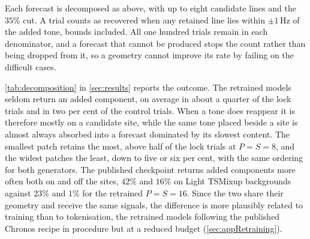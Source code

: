 Each forecast is decomposed as above, with up to eight candidate lines and the $35\%$ cut. A trial counts as recovered when any retained line lies within $\pm1$\,Hz of the added tone, bounds included. All one hundred trials remain in each denominator, and a forecast that cannot be produced stops the count rather than being dropped from it, so a geometry cannot improve its rate by failing on the difficult cases.

\autoref{tab:decomposition} in \autoref{sec:results} reports the outcome. The retrained models seldom return an added component, on average in about a quarter of the lock trials and in two per cent of the control trials. When a tone does reappear it is therefore mostly on a candidate site, while the same tone placed beside a site is almost always absorbed into a forecast dominated by its slowest content. The smallest patch retains the most, above half of the lock trials at $P=S=8$, and the widest patches the least, down to five or six per cent, with the same ordering for both generators. The published checkpoint returns added components more often both on and off the sites, $42\%$ and $16\%$ on Light TSMixup backgrounds against $23\%$ and $1\%$ for the retrained $P=S=16$. Since the two share their geometry and receive the same signals, the difference is more plausibly related to training than to tokenisation, the retrained models following the published Chronos recipe in procedure but at a reduced budget (\autoref{sec:appRetraining}).

